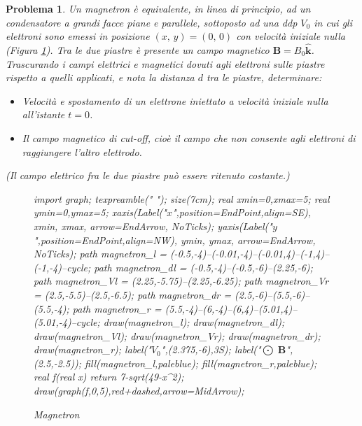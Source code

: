 \documentclass[b5paper,twoside]{book}
\newtheorem{problema}{Problema}
\let\oldhat\hat
\renewcommand{\vec}[1]{\mathbf{#1}}
\renewcommand{\hat}[1]{\widehat{\mathbf{#1}}}
\begin{document}
\begin{problema}
	Un magnetron è equivalente, in linea di principio, ad un condensatore a grandi facce
	piane e parallele, sottoposto ad una ddp $V_0$ in cui gli elettroni sono emessi in
	posizione $(x,\,y) = (0,\,0)$ con velocità iniziale nulla (Figura \ref{fig:magnetron}). Tra
	le due piastre è presente un campo magnetico $\vec{B} = B_0 \hat{k}$. Trascurando i campi
	elettrici e magnetici dovuti agli elettroni sulle piastre rispetto a quelli applicati,
	e nota la distanza $d$ tra le piastre, determinare:
	\begin{itemize}
		\item Velocità e spostamento di un elettrone iniettato a velocità iniziale nulla
		all'istante $t=0$.
		\item Il campo magnetico di cut-off, cioè il campo che non consente agli elettroni
		di raggiungere l'altro elettrodo.
	\end{itemize}
	(Il campo elettrico fra le due piastre può essere ritenuto costante.)
	\begin{figure}[H]
		\centering
		\begin{asy}
			import graph;
			texpreamble("\let\oldhat\hat
			\renewcommand{\vec}[1]{\mathbf{#1}}
			\renewcommand{\hat}[1]{\oldhat{\mathbf{#1}}}");		
			size(7cm);			
			real xmin=0,xmax=5;
			real ymin=0,ymax=5;			
			xaxis(Label("\small $x$",position=EndPoint,align=SE),
			xmin, xmax, arrow=EndArrow, NoTicks);			
			yaxis(Label("\small $y$",position=EndPoint,align=NW),
			ymin, ymax, arrow=EndArrow, NoTicks);			
			path magnetron_l = (-0.5,-4)--(-0.01,-4)--(-0.01,4)--(-1,4)--(-1,-4)--cycle;
			path magnetron_dl = (-0.5,-4)--(-0.5,-6)--(2.25,-6);
			path magnetron_Vl = (2.25,-5.75)--(2.25,-6.25);
			path magnetron_Vr = (2.5,-5.5)--(2.5,-6.5);
			path magnetron_dr = (2.5,-6)--(5.5,-6)--(5.5,-4);
			path magnetron_r = (5.5,-4)--(6,-4)--(6,4)--(5.01,4)--(5.01,-4)--cycle;			
			draw(magnetron_l);
			draw(magnetron_dl);
			draw(magnetron_Vl);
			draw(magnetron_Vr);
			draw(magnetron_dr);
			draw(magnetron_r);
			label("\small $V_0$",(2.375,-6),3S);
			label("\small $\bigodot \; \vec{B}$",(2.5,-2.5));
			fill(magnetron_l,paleblue);
			fill(magnetron_r,paleblue);			
			real f(real x) {return 7-sqrt(49-x^2);}
			draw(graph(f,0,5),red+dashed,arrow=MidArrow);
		\end{asy}
		\caption{Magnetron}
		\label{fig:magnetron}
	\end{figure}
\end{problema}
\end{document}
